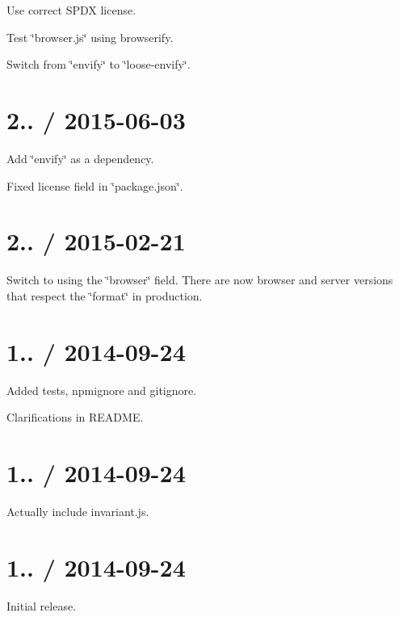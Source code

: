 
\begin{DoxyItemize}
\item Use correct S\+P\+DX license.
\item Test \char`\"{}browser.\+js\char`\"{} using browserify.
\item Switch from \char`\"{}envify\char`\"{} to \char`\"{}loose-\/envify\char`\"{}.
\end{DoxyItemize}

\section*{2.. / 2015-\/06-\/03 }


\begin{DoxyItemize}
\item Add \char`\"{}envify\char`\"{} as a dependency.
\item Fixed license field in \char`\"{}package.\+json\char`\"{}.
\end{DoxyItemize}

\section*{2.. / 2015-\/02-\/21 }


\begin{DoxyItemize}
\item Switch to using the \char`\"{}browser\char`\"{} field. There are now browser and server versions that respect the \char`\"{}format\char`\"{} in production.
\end{DoxyItemize}

\section*{1.. / 2014-\/09-\/24 }


\begin{DoxyItemize}
\item Added tests, npmignore and gitignore.
\item Clarifications in R\+E\+A\+D\+ME.
\end{DoxyItemize}

\section*{1.. / 2014-\/09-\/24 }


\begin{DoxyItemize}
\item Actually include \textquotesingle{}invariant.\+js\textquotesingle{}.
\end{DoxyItemize}

\section*{1.. / 2014-\/09-\/24 }


\begin{DoxyItemize}
\item Initial release. 
\end{DoxyItemize}